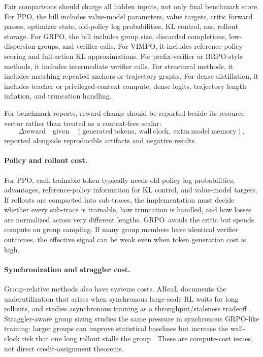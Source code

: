 \documentclass[11pt]{article}
\newcommand{\grpo}{\textsc{GRPO}}
\newcommand{\ppo}{\textsc{PPO}}
\newcommand{\vimpo}{\textsc{VIMPO}}
\newcommand{\brpo}{\textsc{BRPO}}
\begin{document}
Fair comparisons should charge all hidden inputs, not only final benchmark
score. For \ppo, the bill includes value-model parameters, value targets,
critic forward passes, optimizer state, old-policy log probabilities, KL
control, and rollout storage. For \grpo, the bill includes group size,
discarded completions, low-dispersion groups, and verifier calls. For
\vimpo, it includes reference-policy scoring and full-action KL approximations.
For prefix-verifier or \brpo-style methods, it includes intermediate verifier
calls. For structural methods, it includes matching repeated anchors or
trajectory graphs. For dense distillation, it includes teacher or
privileged-context compute, dense logits, trajectory length inflation, and
truncation handling.

For benchmark reports, reward change should be reported beside its resource
vector rather than treated as a context-free scalar:
\begin{equation}
\Delta \mathrm{reward}
\quad\text{given}\quad
(\mathrm{generated\ tokens},\ \mathrm{wall\ clock},\
\mathrm{extra\ model\ memory}),
\end{equation}
reported alongside reproducible artifacts and negative results.

\paragraph{Policy and rollout cost.}
For \ppo, each trainable token typically needs old-policy log probabilities,
advantages, reference-policy information for KL control, and value-model
targets. If rollouts are compacted into sub-traces, the implementation must
decide whether every sub-trace is trainable, how truncation is handled, and how
losses are normalized across very different lengths. \grpo\ avoids the critic
but spends compute on group sampling. If many group members have identical
verifier outcomes, the effective signal can be weak even when token generation
cost is high.

\paragraph{Synchronization and straggler cost.}
Group-relative methods also have systems costs. AReaL documents the
underutilization that arises when synchronous large-scale RL waits for long
rollouts, and studies asynchronous training as a throughput/staleness tradeoff
\citep{fu2025areal}. Straggler-aware group sizing studies the same pressure in
synchronous \grpo-like training: larger groups can improve statistical
baselines but increase the wall-clock risk that one long rollout stalls the
group \citep{khan2026straggler}. These are compute-cost issues, not direct
credit-assignment theorems.
\end{document}
